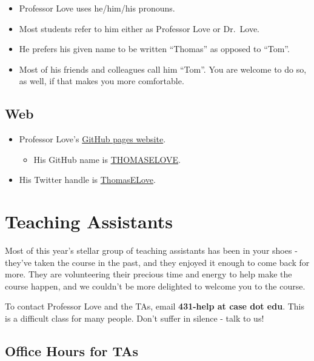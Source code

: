 \documentclass[
]{book}
\providecommand{\tightlist}{%
  \setlength{\itemsep}{0pt}\setlength{\parskip}{0pt}}
\begin{document}
\begin{itemize}
\tightlist
\item
  Professor Love uses he/him/his pronouns.
\item
  Most students refer to him either as Professor Love or Dr.~Love.
\item
  He prefers his given name to be written ``Thomas'' as opposed to ``Tom''.
\item
  Most of his friends and colleagues call him ``Tom''. You are welcome to do so, as well, if that makes you more comfortable.
\end{itemize}

\hypertarget{web}{%
\section{Web}\label{web}}

\begin{itemize}
\tightlist
\item
  Professor Love's \href{https://thomaselove.github.io/}{GitHub pages website}.

  \begin{itemize}
  \tightlist
  \item
    His GitHub name is \href{https://github.com/thomaselove}{THOMASELOVE}.
  \end{itemize}
\item
  His Twitter handle is \href{https://twitter.com/ThomasELove}{ThomasELove}.
\end{itemize}

\hypertarget{teaching-assistants}{%
\chapter{Teaching Assistants}\label{teaching-assistants}}

Most of this year's stellar group of teaching assistants has been in your shoes - they've taken the course in the past, and they enjoyed it enough to come back for more. They are volunteering their precious time and energy to help make the course happen, and we couldn't be more delighted to welcome you to the course.

To contact Professor Love and the TAs, email \textbf{431-help at case dot edu}. This is a difficult class for many people. Don't suffer in silence - talk to us!

\hypertarget{office-hours-for-tas}{%
\section{Office Hours for TAs}\label{office-hours-for-tas}}
\end{document}

